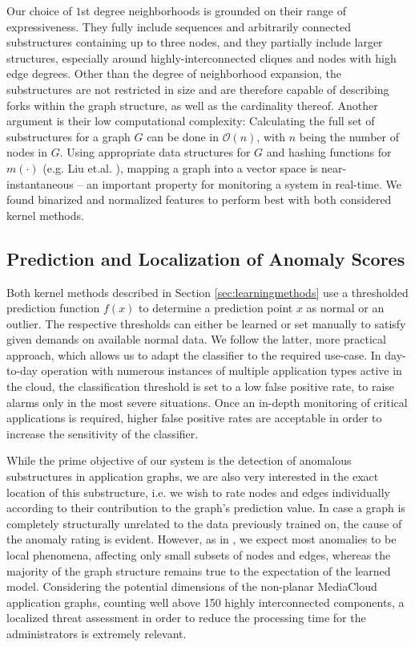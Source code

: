 \documentclass{llncs}
\begin{document}
Our choice of $1$st degree neighborhoods is grounded on their range of expressiveness. They fully include sequences and arbitrarily connected substructures containing up to three nodes, and they partially include larger structures, especially around highly-interconnected cliques and nodes with high edge degrees. Other than the degree of neighborhood expansion, the substructures are not restricted in size and are therefore capable of describing forks within the graph structure, as well as the cardinality thereof. Another argument is their low computational complexity: Calculating the full set of substructures for a graph $G$ can be done in $\mathcal O(n)$, with $n$ being the number of nodes in $G$. Using appropriate data structures for $G$ and hashing functions for $m(\cdot)$ (e.g. Liu et.al. \cite{LiuWanKumCha11}), mapping a graph into a vector space is near-instantaneous -- an important property for monitoring a system in real-time. We found binarized and normalized features to perform best with both considered kernel methods.







 
\subsection{Prediction and Localization of Anomaly Scores}
\label{sec:pred}

Both kernel methods described in Section \ref{sec:learningmethods} use a thresholded prediction function $f(x)$ to determine a prediction point $x$ as normal or an outlier.
The respective thresholds can either be learned \cite{scholkopf1999support,tax2004support} or set manually to satisfy given demands on available normal data. We follow the latter, more practical approach, which allows us to adapt the classifier to the required use-case. In day-to-day operation with numerous instances of multiple application types active in the cloud, the classification threshold is set to a low false positive rate, to raise alarms only in the most severe situations. Once an in-depth monitoring of critical applications is required, higher false positive rates are acceptable in order to increase the sensitivity of the classifier.

While the prime objective of our system is the detection of anomalous substructures in application graphs, we are also very interested in the exact location of this substructure, i.e. we wish to rate nodes and edges individually according to their contribution to the graph's prediction value.
In case a graph is completely structurally unrelated to the data previously trained on, the cause of the anomaly rating is evident. However, as in \cite{eberle2007mining}, we expect most anomalies to be local phenomena, affecting only small subsets of nodes and edges, whereas the majority of the graph structure remains true to the expectation of the learned model. Considering the potential dimensions of the non-planar MediaCloud application graphs, counting well above 150 highly interconnected components, a localized threat assessment in order to reduce the processing time for the administrators is extremely relevant.
\end{document}
